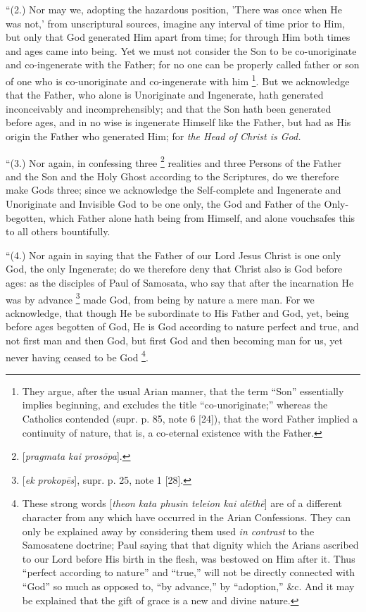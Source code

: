 ``(2.) Nor may we, adopting the
hazardous position, 'There was once when He was not,' from
unscriptural sources, imagine any interval of time prior to Him, but
only that God generated Him apart from time; for through Him both
times and ages came into being. Yet we must not consider the Son to be
co-unoriginate and co-ingenerate with the Father; for no one can be
properly called father or son of one who is co-unoriginate and
co-ingenerate with him \footnote{They argue, after the usual Arian manner, that the term ``Son''
essentially implies beginning, and excludes the title ``co-unoriginate;''
whereas the Catholics contended (supr. p. 85, note 6 [24]), that the word
Father implied a continuity of nature, that is, a co-eternal existence
with the Father.}.
But we acknowledge that the Father, who alone is Unoriginate and
Ingenerate, hath generated inconceivably and incomprehensibly; and
that the Son hath been generated before ages, and in no wise is
ingenerate Himself like the Father, but had as His origin the Father
who generated Him; for \emph{the Head of Christ is God.}

``(3.) Nor again, in confessing
three \footnote{[\emph{pragmata kai pros\={o}pa}].} realities and
three Persons of the Father and the Son and the Holy Ghost according
to the Scriptures, do we therefore make Gods three; since we
acknowledge the Self-complete and Ingenerate and Unoriginate and
Invisible God to be one only, the God and Father of the Only-begotten,
which Father alone hath being from Himself, and alone vouchsafes this
to all others bountifully.

``(4.) Nor again in saying that
the Father of our Lord Jesus Christ is one only God, the only
Ingenerate; do we therefore deny that Christ also is God before ages:
as the disciples of Paul of Samosata, who say that after the
incarnation He was by advance \footnote{[\emph{ek prokop\={e}s}], supr. p. 25, note 1 [28].} made God, from being by nature a mere man. For we acknowledge,
that though He be subordinate to His Father and God, yet, being before
ages begotten of God, He is God according to nature perfect and true,
and not first man and then God, but first God and then becoming man
for us, yet never having ceased to be God \footnote{These strong words [\emph{theon kata phusin teleion kai al\={e}th\={e}}]
are of a different character from any which have occurred in the Arian
Confessions. They can only be explained away by considering them used \emph{in
contrast} to the Samosatene doctrine; Paul saying that that dignity
which the Arians ascribed to our Lord before His birth in the flesh,
was bestowed on Him after it. Thus ``perfect according to nature'' and ``true,''
will not be directly connected with ``God'' so much as opposed to, ``by
advance,'' by ``adoption,'' \&c. And it may be explained that the gift
of grace is a new and divine nature.}.


